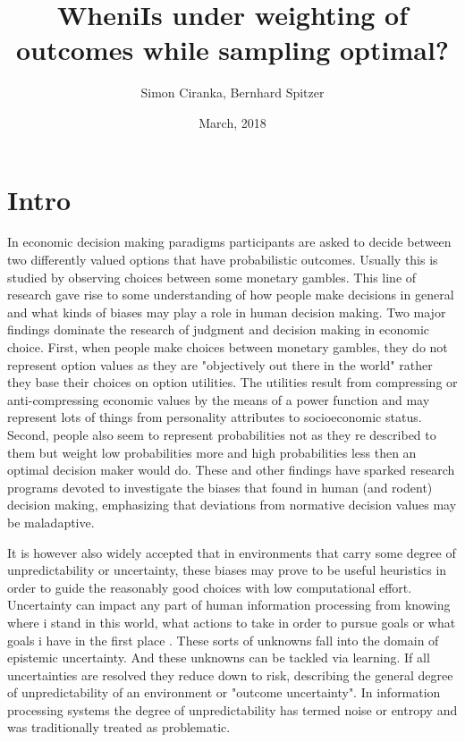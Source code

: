 \documentclass[apa]{article}
\title{WheniIs under weighting of outcomes while sampling optimal?}
\author{Simon Ciranka, Bernhard Spitzer}
\date{March, 2018}
\begin{document}
\maketitle

\section{Intro}
In economic decision making paradigms participants are asked to decide between two differently valued options that have probabilistic outcomes. Usually this is studied by observing choices between some monetary gambles. This line of research gave rise to some understanding of how people make decisions in general and what kinds of biases may play a role in human decision making. 
Two major findings dominate the research of judgment and decision making in economic choice. First, when people make choices between monetary gambles, they do not represent option values as they are "objectively out there in the world" rather they base their choices on option utilities. The utilities result from compressing or anti-compressing economic values by the means of a power function and may represent lots of things from personality attributes to socioeconomic status. Second, people also seem to represent probabilities not as they re described to them but weight low probabilities more and high probabilities less then an optimal decision maker would do. These and other findings have sparked research programs devoted to investigate the biases that found in human (and rodent) decision making, emphasizing that deviations from normative decision values may be maladaptive. 

It is however also widely accepted that in environments that carry some degree of unpredictability or uncertainty, these biases may prove to be useful heuristics in order to guide the reasonably good choices with low computational effort. Uncertainty can impact any part of human information processing from knowing where i stand in this world, what actions to take in order to pursue goals or what goals i have in the first place \cite{Bach2012}. These sorts of unknowns fall into the domain of epistemic uncertainty. And these unknowns can be tackled via learning. If all uncertainties are resolved they reduce down to risk, describing the general degree of unpredictability of an environment or "outcome uncertainty". In information processing systems the degree of unpredictability has termed noise or entropy and was traditionally treated as problematic.
\end{document}
